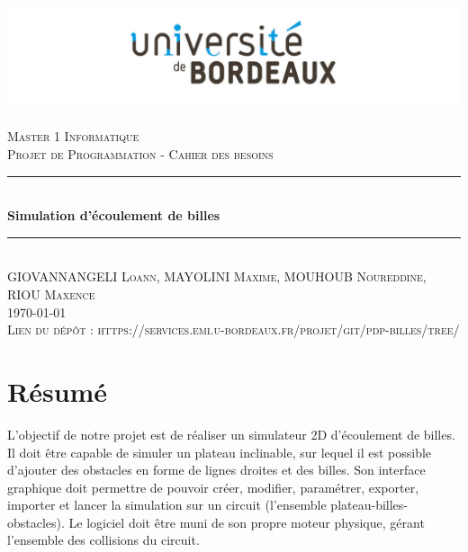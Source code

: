 \documentclass{report}
\newcommand{\HRule}{\rule{\linewidth}{0.5mm}}
\begin{document}
%
	\begin{titlepage}
	\begin{center}
		\includegraphics[scale=0.30]{universite-Bordeaux.jpg}~\\[1.5cm]
		\textsc{\LARGE Master 1 Informatique}\\[2cm]
		
		\textsc{\Large Projet de Programmation - Cahier des besoins}\\[1.5cm]
		
		\HRule \\[0.4cm]
		{  \huge{\bfseries Simulation d'écoulement de billes}\\[0.4cm] }
		\HRule \\[2cm]
		
		\textsc{GIOVANNANGELI Loann, MAYOLINI Maxime, MOUHOUB Noureddine, RIOU Maxence}\\[0.4cm]
		
    	\textsc{\large \today} \\
        \vspace{2cm}
        \textsc{Lien du dépôt : https://services.emi.u-bordeaux.fr/projet/git/pdp-billes/tree/}
	\end{center}
	\end{titlepage}
    
    
\chapter*{Résumé}

L'objectif de notre projet est de réaliser un simulateur 2D d'écoulement de billes. Il doit être capable de simuler un plateau inclinable, sur lequel il est possible d’ajouter des obstacles en forme de lignes droites et des billes. Son interface graphique doit permettre de pouvoir créer, modifier, paramétrer, exporter, importer et lancer la simulation sur un circuit (l’ensemble plateau-billes-obstacles). Le logiciel doit être muni de son propre moteur physique, gérant l’ensemble des collisions du circuit. \\
\end{document}
